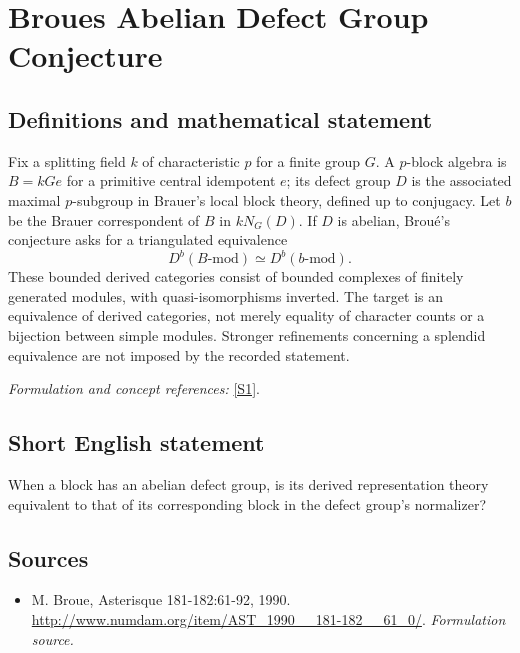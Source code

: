 \documentclass[11pt]{article}
\begin{document}
\section*{\texorpdfstring{Broues Abelian Defect Group Conjecture}{Broues Abelian Defect Group Conjecture}}\label{337}
\subsection{Definitions and mathematical statement}
Fix a splitting field $k$ of characteristic $p$ for a finite group $G$. A $p$-block algebra is $B=kGe$ for a primitive central idempotent $e$; its defect group $D$ is the associated maximal $p$-subgroup in Brauer's local block theory, defined up to conjugacy. Let $b$ be the Brauer correspondent of $B$ in $kN_G(D)$. If $D$ is abelian, Brou\'e's conjecture asks for a triangulated equivalence
\[
 D^b(B\text{-}\mathrm{mod})\simeq D^b(b\text{-}\mathrm{mod}).
\]
These bounded derived categories consist of bounded complexes of finitely generated modules, with quasi-isomorphisms inverted. The target is an equivalence of derived categories, not merely equality of character counts or a bijection between simple modules. Stronger refinements concerning a splendid equivalence are not imposed by the recorded statement.
\par\smallskip\textit{Formulation and concept references:} \href{http://www.numdam.org/item/AST_1990__181-182__61_0/}{[S1]}.

\subsection{Short English statement}
When a block has an abelian defect group, is its derived representation theory equivalent to that of its corresponding block in the defect group's normalizer?
\subsection{Sources}
\begin{itemize}
\item[S1]M. Broue, Asterisque 181-182:61-92, 1990.
\url{http://www.numdam.org/item/AST_1990__181-182__61_0/}.
\textit{Formulation source.}
\end{itemize}
\end{document}
